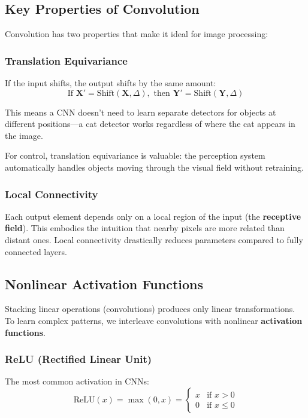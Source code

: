 \subsection{Key Properties of Convolution}

Convolution has two properties that make it ideal for image processing:

\subsubsection{Translation Equivariance}

If the input shifts, the output shifts by the same amount:
\begin{equation}
\text{If } \mathbf{X}' = \text{Shift}(\mathbf{X}, \Delta), \text{ then } \mathbf{Y}' = \text{Shift}(\mathbf{Y}, \Delta)
\end{equation}

This means a CNN doesn't need to learn separate detectors for objects at different positions---a cat detector works regardless of where the cat appears in the image.

For control, translation equivariance is valuable: the perception system automatically handles objects moving through the visual field without retraining.

\subsubsection{Local Connectivity}

Each output element depends only on a local region of the input (the \textbf{receptive field}). This embodies the intuition that nearby pixels are more related than distant ones. Local connectivity drastically reduces parameters compared to fully connected layers.

\subsection{Nonlinear Activation Functions}

Stacking linear operations (convolutions) produces only linear transformations. To learn complex patterns, we interleave convolutions with nonlinear \textbf{activation functions}.

\subsubsection{ReLU (Rectified Linear Unit)}

The most common activation in CNNs:
\begin{equation}
\text{ReLU}(x) = \max(0, x) = \begin{cases} x & \text{if } x > 0 \\ 0 & \text{if } x \leq 0 \end{cases}
\label{eq:relu}
\end{equation}

